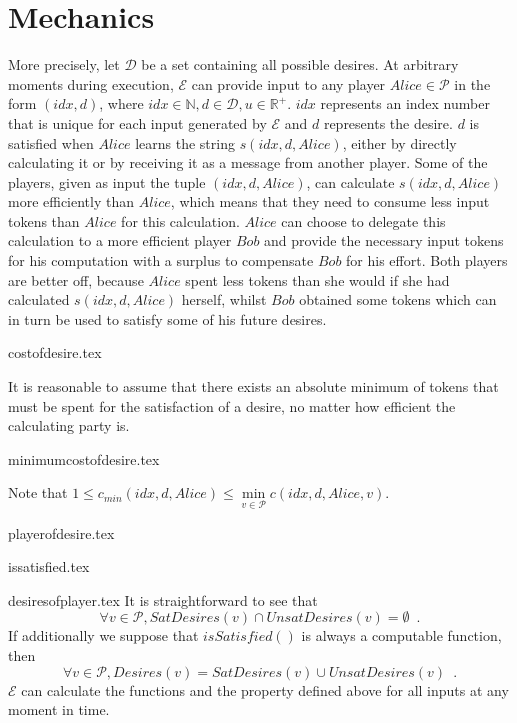 \section{Mechanics}
  More precisely, let $\mathcal{D}$ be a set containing all possible desires. At arbitrary
  moments during execution, $\mathcal{E}$ can provide input to any player $Alice \in
  \mathcal{P}$ in the form $\left(idx, d\right)$, where $idx \in \mathbb{N}, d \in
  \mathcal{D}, u \in \mathbb{R}^{+}$. $idx$ represents an index number that is unique for
  each input generated by $\mathcal{E}$ and $d$ represents the desire. $d$ is satisfied
  when $Alice$ learns the string $s\left(idx, d, Alice\right)$, either by directly
  calculating it or by receiving it as a message from another player. Some of the players,
  given as input the tuple $\left(idx, d, Alice\right)$, can calculate $s\left(idx, d,
  Alice\right)$ more efficiently than $Alice$, which means that they need to consume less
  input tokens than $Alice$ for this calculation. $Alice$ can choose to delegate this
  calculation to a more efficient player $Bob$ and provide the necessary input tokens for
  his computation with a surplus to compensate $Bob$ for his effort. Both players are
  better off, because $Alice$ spent less tokens than she would if she had calculated
  $s\left(idx, d, Alice\right)$ herself, whilst $Bob$ obtained some tokens which can in
  turn be used to satisfy some of his future desires.

  {costofdesire.tex}

  It is reasonable to assume that there exists an absolute minimum of tokens that must be
  spent for the satisfaction of a desire, no matter how efficient the calculating party
  is.

  {minimumcostofdesire.tex}

  \noindent Note that $1 \leq c_{min}\left(idx, d, Alice\right) \leq \min\limits_{v \in
  \mathcal{P}}{c\left(idx, d, Alice, v\right)}$.

  {playerofdesire.tex}

  {issatisfied.tex}

  {desiresofplayer.tex}
  It is straightforward to see that
  \begin{equation*}
    \forall v \in \mathcal{P}, SatDesires\left(v\right) \cap UnsatDesires\left(v\right) =
    \emptyset \enspace.
  \end{equation*}
  If additionally we suppose that $isSatisfied\left(\right)$ is always a computable
  function, then
  \begin{equation*}
    \forall v \in \mathcal{P}, Desires\left(v\right) = SatDesires\left(v\right) \cup
    UnsatDesires\left(v\right) \enspace.
  \end{equation*}
  $\mathcal{E}$ can calculate the functions and the property defined above for all inputs
  at any moment in time.

